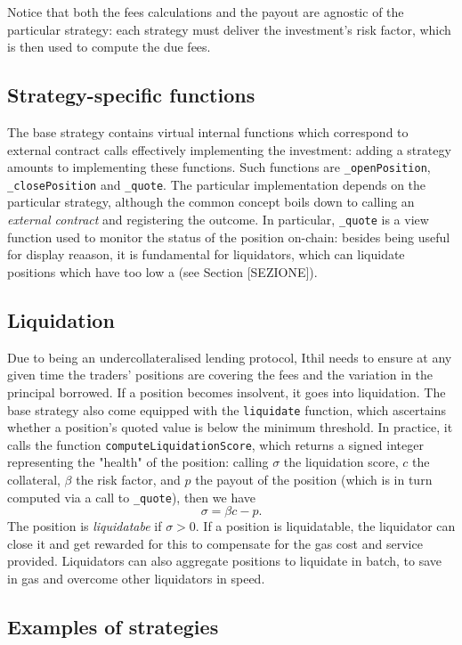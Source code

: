 \documentclass[a4paper,10 pt]{article}
\theoremstyle{definition}
\begin{document}
Notice that both the fees calculations and the payout are agnostic of the particular strategy: each strategy must deliver the investment's risk factor, which is then used to compute the due fees.

\subsection{Strategy-specific functions}

The base strategy contains virtual internal functions which correspond to external contract calls effectively implementing the investment: adding a strategy amounts to implementing these functions. Such functions are \verb|_openPosition|, \verb|_closePosition| and \verb|_quote|. The particular implementation depends on the particular strategy, although the common concept boils down to calling an {\it external contract} and registering the outcome. In particular, \verb|_quote| is a view function used to monitor the status of the position on-chain: besides being useful for display reaason, it is fundamental for liquidators, which can liquidate positions which have too low a  (see Section [SEZIONE]).

\subsection{Liquidation}
Due to being an undercollateralised lending protocol, Ithil needs to ensure at any given time the traders' positions are covering the fees and the variation in the principal borrowed. If a position becomes insolvent, it goes into liquidation. \cite{arxivLiquidation}
The base strategy also come equipped with the \verb|liquidate| function, which ascertains whether a position's quoted value is below the minimum threshold. In practice, it calls the function \verb|computeLiquidationScore|, which returns a signed integer representing the "health" of the position: calling $\sigma$ the liquidation score, $c$ the collateral, $\beta$ the risk factor, and $p$ the payout of the position (which is in turn computed via a call to \verb|_quote|), then we have
$$\sigma = \beta c - p.$$
The position is {\it liquidatabe} if $\sigma > 0$. If a position is liquidatable, the liquidator can close it and get rewarded for this to compensate for the gas cost and service provided. Liquidators can also aggregate positions to liquidate in batch, to save in gas and overcome other liquidators in speed.

\subsection{Examples of strategies}
\end{document}
